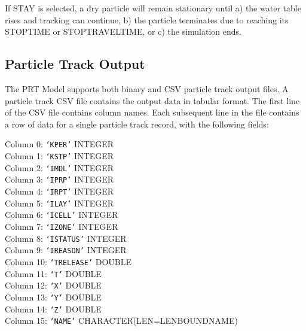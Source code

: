 If STAY is selected, a dry particle will remain stationary until a) the water table rises and tracking can continue, b) the particle terminates due to reaching its STOPTIME or STOPTRAVELTIME, or c) the simulation ends.

\subsection{Particle Track Output}

The PRT Model supports both binary and CSV particle track output files. A particle track CSV file contains the output data in tabular format. The first line of the CSV file contains column names. Each subsequent line in the file contains a row of data for a single particle track record, with the following fields:

\vspace{5mm}
\noindent Column 0: \texttt{`KPER'} {\color{red} \footnotesize{INTEGER}} \\
\noindent Column 1: \texttt{`KSTP'} {\color{red} \footnotesize{INTEGER}} \\
\noindent Column 2: \texttt{`IMDL'} {\color{red} \footnotesize{INTEGER}} \\
\noindent Column 3: \texttt{`IPRP'} {\color{red} \footnotesize{INTEGER}} \\
\noindent Column 4: \texttt{`IRPT'} {\color{red} \footnotesize{INTEGER}} \\
\noindent Column 5: \texttt{`ILAY'} {\color{red} \footnotesize{INTEGER}} \\
\noindent Column 6: \texttt{`ICELL'} {\color{red} \footnotesize{INTEGER}} \\
\noindent Column 7: \texttt{`IZONE'} {\color{red} \footnotesize{INTEGER}} \\
\noindent Column 8: \texttt{`ISTATUS'} {\color{red} \footnotesize{INTEGER}} \\
\noindent Column 9: \texttt{`IREASON'} {\color{red} \footnotesize{INTEGER}} \\
\noindent Column 10: \texttt{`TRELEASE'} {\color{red} \footnotesize{DOUBLE}} \\
\noindent Column 11: \texttt{`T'} {\color{red} \footnotesize{DOUBLE}} \\
\noindent Column 12: \texttt{`X'} {\color{red} \footnotesize{DOUBLE}} \\
\noindent Column 13: \texttt{`Y'} {\color{red} \footnotesize{DOUBLE}} \\
\noindent Column 14: \texttt{`Z'} {\color{red} \footnotesize{DOUBLE}} \\
\noindent Column 15: \texttt{`NAME'} {\color{red} \footnotesize{CHARACTER(LEN=LENBOUNDNAME)}} \\

